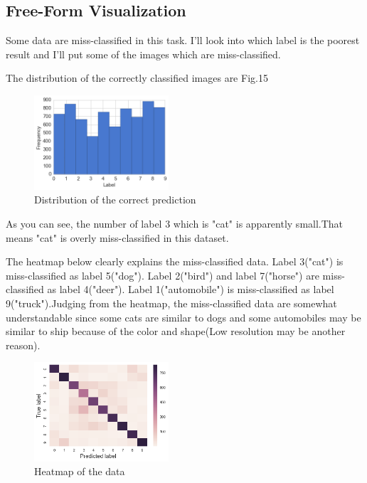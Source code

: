 \subsection{Free-Form Visualization}
Some data are miss-classified in this task. I'll look into which label is the poorest result and I'll put some of the images which are miss-classified.

The distribution of the correctly classified images are Fig.15

\begin{figure}[H]

	\begin{center}
	\includegraphics[width=5cm]{picture/label_correct.png}
	\caption{Distribution of the correct prediction}
	\end{center}
	\label{fig:15}

\end{figure}

As you can see, the number of label 3 which is "cat" is apparently small.That means "cat" is overly miss-classified in this dataset.







The heatmap below clearly explains the miss-classified data. Label 3("cat") is miss-classified as label 5("dog"). Label 2("bird") and label 7("horse") are miss-classified as label 4("deer"). Label 1("automobile") is miss-classified as label 9("truck").Judging from the heatmap, the miss-classified data are somewhat understandable since some cats are similar to dogs and some automobiles may be similar to ship because of the color and shape(Low resolution may be another reason).




\begin{figure}[H]

	\begin{center}
	\includegraphics[width=5cm]{picture/heatmap.png}
	\caption{Heatmap of the data}
	\end{center}
	\label{fig:17}

\end{figure}